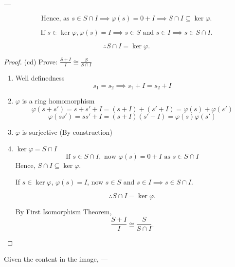 \documentclass[11pt]{article}
\theoremstyle{definition}
\theoremstyle{remark}
\begin{document}
---

\[
\text{Hence, as } s \in S \cap I \implies \varphi(s) = 0 + I \implies S \cap I \subseteq \ker \varphi.
\]

\[
\text{If } s \in \ker \varphi, \varphi(s) = I \implies s \in S \text{ and } s \in I \implies s \in S \cap I.
\]

\[
\therefore S \cap I = \ker \varphi.
\]

\begin{proof}
(cd) Prove: $\frac{S+I}{I} \cong \frac{S}{S \cap I}$

\begin{enumerate}
    \item[(1)] Well definedness
    \[
    s_1 = s_2 \implies s_1 + I = s_2 + I
    \]

    \item[(2)] $\varphi$ is a ring homomorphism
    \[
    \varphi(s + s') = s + s' + I = (s + I) + (s' + I) = \varphi(s) + \varphi(s')
    \]
    \[
    \varphi(ss') = ss' + I = (s + I)(s' + I) = \varphi(s)\varphi(s')
    \]

    \item[(3)] $\varphi$ is surjective (By construction)

    \item[(4)] $\ker \varphi = S \cap I$
    \[
    \text{If } s \in S \cap I, \text{ now } \varphi(s) = 0 + I \text{ as } s \in S \cap I
    \]
    Hence, $S \cap I \subseteq \ker \varphi$.

    If $s \in \ker \varphi$, $\varphi(s) = I$, now $s \in S$ and $s \in I \implies s \in S \cap I$.

    \[
    \therefore S \cap I = \ker \varphi.
    \]

    By First Isomorphism Theorem,
    \[
    \frac{S + I}{I} \cong \frac{S}{S \cap I}.
    \]
\end{enumerate}
\end{proof}

Given the content in the image, 
---
\end{document}

